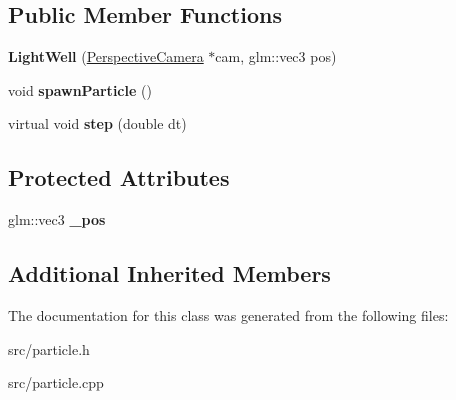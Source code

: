 \subsection*{Public Member Functions}
\begin{DoxyCompactItemize}
\item 
\hypertarget{class_light_well_a211419be5b7ea554fc5b92af2e5fbf1b}{}{\bfseries Light\+Well} (\hyperlink{class_perspective_camera}{Perspective\+Camera} $\ast$cam, glm\+::vec3 pos)\label{class_light_well_a211419be5b7ea554fc5b92af2e5fbf1b}

\item 
\hypertarget{class_light_well_abeca4d5eb016e860bc73910883abd79b}{}void {\bfseries spawn\+Particle} ()\label{class_light_well_abeca4d5eb016e860bc73910883abd79b}

\item 
\hypertarget{class_light_well_a2ef68e3a0a2da1f7f8d9f0f329f53348}{}virtual void {\bfseries step} (double dt)\label{class_light_well_a2ef68e3a0a2da1f7f8d9f0f329f53348}

\end{DoxyCompactItemize}
\subsection*{Protected Attributes}
\begin{DoxyCompactItemize}
\item 
\hypertarget{class_light_well_a90ba1983609cbb3c483d8a023a4bef02}{}glm\+::vec3 {\bfseries \+\_\+pos}\label{class_light_well_a90ba1983609cbb3c483d8a023a4bef02}

\end{DoxyCompactItemize}
\subsection*{Additional Inherited Members}


The documentation for this class was generated from the following files\+:\begin{DoxyCompactItemize}
\item 
src/particle.\+h\item 
src/particle.\+cpp\end{DoxyCompactItemize}
